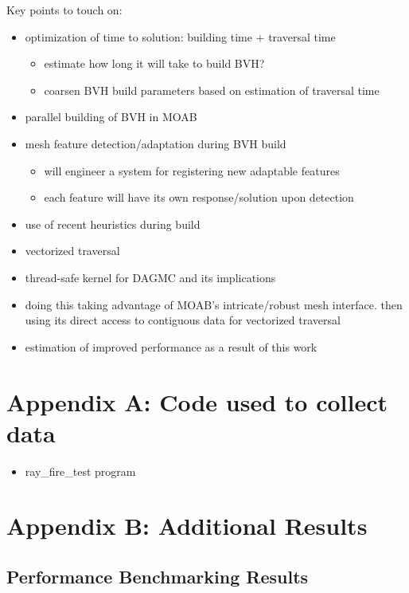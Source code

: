 \documentclass[10pt, a4paper]{article}
\begin{document}
Key points to touch on:
\begin{itemize}
\item optimization of time to solution: building time + traversal time
  \begin{itemize}
  \item estimate how long it will take to build BVH?
  \item coarsen BVH build parameters based on estimation of traversal time
  \end{itemize}
\item parallel building of BVH in MOAB
\item mesh feature detection/adaptation during BVH build
  \begin{itemize}
  \item will engineer a system for registering new adaptable features
  \item each feature will have its own response/solution upon detection
  \end{itemize}
\item use of recent heuristics during build
\item vectorized traversal
\item thread-safe kernel for DAGMC and its implications
\item doing this taking advantage of MOAB's intricate/robust mesh interface. then using its direct access to contiguous data for vectorized traversal
\item estimation of improved performance as a result of this work
\end{itemize}






\section{Appendix A: Code used to collect data}%
\begin{itemize}
\item ray\_fire\_test program
\end{itemize}

\section{Appendix B: Additional Results}%

\subsection{Performance Benchmarking Results}%
\end{document}
